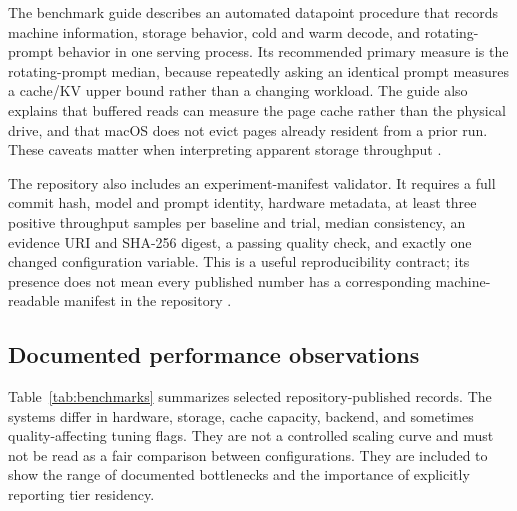 \documentclass[10pt,twocolumn]{article}
\newcommand{\code}[1]{\texttt{\small\detokenize{#1}}}
\begin{document}
The benchmark guide describes an automated datapoint procedure that records machine information, storage behavior, cold and warm decode, and rotating-prompt behavior in one serving process. Its recommended primary measure is the rotating-prompt median, because repeatedly asking an identical prompt measures a cache/KV upper bound rather than a changing workload. The guide also explains that buffered reads can measure the page cache rather than the physical drive, and that macOS \code{F\_NOCACHE} does not evict pages already resident from a prior run. These caveats matter when interpreting apparent storage throughput \cite{qoralisbench}.

The repository also includes an experiment-manifest validator. It requires a full commit hash, model and prompt identity, hardware metadata, at least three positive throughput samples per baseline and trial, median consistency, an evidence URI and SHA-256 digest, a passing quality check, and exactly one changed configuration variable. This is a useful reproducibility contract; its presence does not mean every published number has a corresponding machine-readable manifest in the repository \cite{qoralismanifest}.

\subsection{Documented performance observations}
Table~\ref{tab:benchmarks} summarizes selected repository-published records. The systems differ in hardware, storage, cache capacity, backend, and sometimes quality-affecting tuning flags. They are not a controlled scaling curve and must not be read as a fair comparison between configurations. They are included to show the range of documented bottlenecks and the importance of explicitly reporting tier residency.
\end{document}
